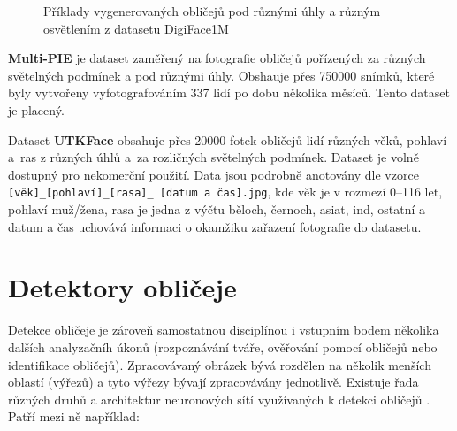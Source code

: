 \begin{figure}[H]
  \begin{center}
  \label{obrazek:digiface}
  \caption{Příklady vygenerovaných obličejů pod různými úhly a různým osvětlením z datasetu DigiFace1M \cite{digiface1m}}
  \end{center}
\end{figure}

\textbf{Multi-PIE} \cite{multipie} je dataset zaměřený na fotografie obličejů pořízených za různých světelných podmínek a pod různými úhly. Obshauje přes 750000 snímků, které byly vytvořeny vyfotografováním 337 lidí po dobu několika měsíců. Tento dataset je placený.

Dataset \textbf{UTKFace} \cite{utkface} obsahuje přes 20000 fotek obličejů lidí různých věků, pohlaví a~ras z různých úhlů a~za rozličných světelných podmínek. Dataset je volně dostupný pro nekomerční použití. Data jsou podrobně anotovány dle vzorce \texttt{[věk]\_[pohlaví]\_[rasa]\_
[datum a čas].jpg}, kde věk je v rozmezí 0--116 let, pohlaví muž/žena, rasa je jedna z výčtu běloch, černoch, asiat, ind, ostatní a datum a čas uchovává informaci o okamžiku zařazení fotografie do datasetu.

\section{Detektory obličeje}
\label{sekce:NSdetektory}

Detekce obličeje je zároveň samostatnou disciplínou i vstupním bodem několika dalších analyzačníh úkonů (rozpoznávání tváře, ověřování pomocí obličejů nebo identifikace obličejů). Zpracovávaný obrázek bývá rozdělen na několik menších oblastí (výřezů) a tyto výřezy bývají zpracovávány jednotlivě. 
Existuje řada různých druhů a architektur neuronových sítí využívaných k detekci obličejů \cite{fdReviewNS}. Patří mezi ně například:

